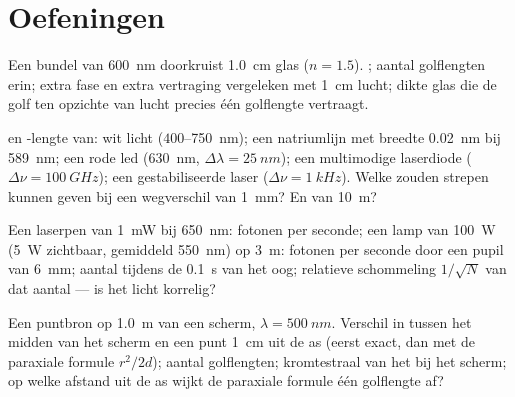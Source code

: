 \section{Oefeningen}

\begin{exercise}[$\star$]\label{exo:b2:scalar-light-model:1}
Een bundel van \qty{600}{nm} doorkruist \qty{1.0}{cm} glas ($n = 1.5$).
; aantal golflengten erin; extra fase en extra vertraging
vergeleken met \qty{1}{cm} lucht; dikte glas die de golf ten opzichte van
lucht precies één golflengte vertraagt.
\end{exercise}

\begin{exercise}[$\star$]\label{exo:b2:scalar-light-model:2}
 en -lengte van: wit licht ($400$--\qty{750}{nm}); een
natriumlijn met breedte \qty{0.02}{nm} bij \qty{589}{nm}; een rode led
(\qty{630}{nm}, $\Delta\lambda = \qty{25}{nm}$); een multimodige laserdiode
($\Delta\nu = \qty{100}{GHz}$); een gestabiliseerde laser
($\Delta\nu = \qty{1}{kHz}$). Welke zouden strepen kunnen geven bij een
wegverschil van \qty{1}{mm}? En van \qty{10}{m}?
\end{exercise}

\begin{exercise}[$\star$]\label{exo:b2:scalar-light-model:3}
Een laserpen van \qty{1}{mW} bij \qty{650}{nm}: fotonen per seconde; een
lamp van \qty{100}{W} (\qty{5}{W} zichtbaar, gemiddeld \qty{550}{nm}) op
\qty{3}{m}: fotonen per seconde door een pupil van \qty{6}{mm}; aantal
tijdens de \qty{0.1}{s} van het oog; relatieve schommeling $1/\sqrt N$ van
dat aantal --- is het licht korrelig?
\end{exercise}

\begin{exercise}[$\star$]\label{exo:b2:scalar-light-model:4}
Een puntbron op \qty{1.0}{m} van een scherm, $\lambda = \qty{500}{nm}$.
Verschil in  tussen het midden van het scherm en een punt
\qty{1}{cm} uit de as (eerst exact, dan met de paraxiale formule $r^2/2d$);
aantal golflengten; kromtestraal van het  bij het scherm; op welke
afstand uit de as wijkt de paraxiale formule één golflengte af?
\end{exercise}

